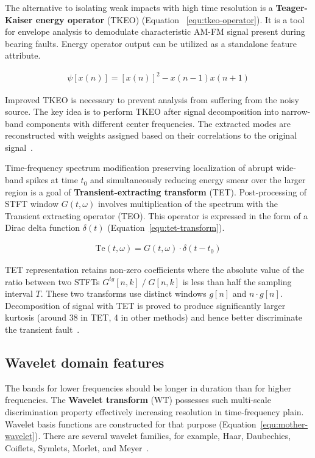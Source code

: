 The alternative to isolating weak impacts with high time resolution is a \textbf{Teager-Kaiser energy operator} (TKEO) (Equation~ \ref{equ:tkeo-operator}). It is a tool for envelope analysis to demodulate characteristic AM-FM signal present during bearing faults. Energy operator output can be utilized as a standalone feature attribute.

\begin{ceqn}\begin{align}
\psi[x(n)] = [x(n)]^2 - x(n - 1)x(n + 1)
\label{equ:tkeo-operator}
\end{align}\end{ceqn}

Improved TKEO is necessary to prevent analysis from suffering from the noisy source. The key idea is to perform TKEO after signal decomposition into narrow-band components with different center frequencies. The extracted modes are reconstructed with weights assigned based on their correlations to the original signal~\cite{shi_application_2022}.

Time-frequency spectrum modification preserving localization of abrupt wide-band spikes at time $t_0$ and simultaneously reducing energy smear over the larger region is a goal of \textbf{Transient-extracting transform} (TET). Post-processing of STFT window $G(t,\omega)$ involves multiplication of the spectrum with the Transient extracting operator (TEO). This operator is expressed in the form of a Dirac delta function $\delta(t)$ (Equation~\ref{equ:tet-transform}).

\begin{ceqn}\begin{align}
\mathrm{Te}(t,\omega) = G(t,\omega) \cdot  \delta(t - t_0)
\label{equ:tet-transform}
\end{align}\end{ceqn}

TET representation retains non-zero coefficients where the absolute value of the ratio between two STFTs $G^{tg}[n, k]\;/\;G[n, k]$ is less than half the sampling interval $T$. These two transforms use distinct windows $g[n]$ and $n \cdot g[n]$. Decomposition of signal with TET is proved to produce significantly larger kurtosis (around 38 in TET, 4 in other methods) and hence better discriminate the transient fault~\cite{yu_concentrated_2020}.

\subsection{Wavelet domain features}
The bands for lower frequencies should be longer in duration than for higher frequencies. The \textbf{Wavelet transform} (WT) possesses such multi-scale discrimination property effectively increasing resolution in time-frequency plain. Wavelet basis functions are constructed for that purpose (Equation~\ref{equ:mother-wavelet}). There are several wavelet families, for example, Haar, Daubechies, Coiflets, Symlets, Morlet, and Meyer~\cite{nandi_condition_2019}.

